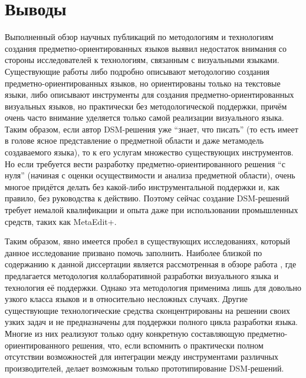 \section{Выводы}
Выполненный обзор научных публикаций по методологиям и технологиям создания предметно-ориентированных 
языков выявил недостаток внимания со стороны исследователей к технологиям, связанным 
с визуальными языками. Существующие работы либо подробно описывают методологию создания 
предметно-ориентированных языков, но ориентированы только на текстовые языки, либо 
описывают инструменты для создания предметно-ориентированных визуальных языков, но 
практически без методологической поддержки, причём очень часто внимание уделяется 
только самой реализации визуального языка. Таким образом, если автор DSM-решения уже 
"`знает, что писать"' (то есть имеет в голове ясное представление о предметной области 
и даже метамодель создаваемого языка), то к его услугам множество существующих инструментов. 
Но если требуется вести разработку предметно-ориентированного решения "`с нуля"' (начиная 
с оценки осуществимости и анализа предметной области), очень многое придётся делать 
без какой-либо инструментальной поддержки и, как правило, без руководства к действию. 
Поэтому сейчас создание DSM-решений требует немалой квалификации и опыта даже при 
использовании промышленных средств, таких как MetaEdit+.

Таким образом, явно имеется пробел в существующих исследованиях, который данное исследование
призвано помочь заполнить. Наиболее близкой по содержанию к данной диссертации является
рассмотренная в обзоре работа \cite{repenning1995agentsheets}, где предлагается методология
коллаборативной разработки визуального языка и технология её поддержки. Однако эта
методология применима лишь для довольно узкого класса языков и в относительно несложных
случаях. Другие существующие технологические средства сконцентрированы на решении
своих узких задач и не предназначены для поддержки полного цикла разработки языка.
Многие из них реализуют только одну конкретную составляющую предметно-ориентированного
решения, что, если вспомнить о практически полном отсутствии возможностей для интеграции
между инструментами различных производителей, делает возможным только прототипирование
DSM-решений.
